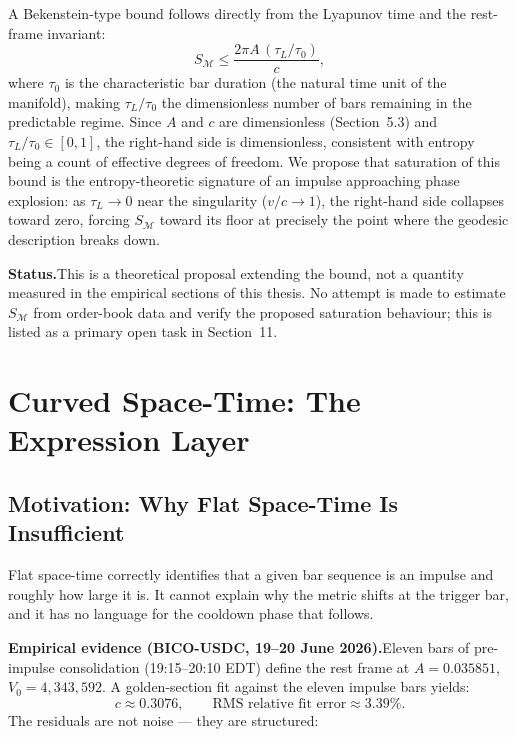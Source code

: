 \documentclass[12pt,a4paper]{article}
\begin{document}
A Bekenstein-type bound follows directly from the Lyapunov time and the
rest-frame invariant:
\begin{equation}
    \boxed{S_{\mathcal{M}} \leq \frac{2\pi A\,(\tau_L/\tau_0)}{c},}
    \label{eq:entropy_bound}
\end{equation}
where $\tau_0$ is the characteristic bar duration (the natural time
unit of the manifold), making $\tau_L/\tau_0$ the dimensionless number
of bars remaining in the predictable regime. Since $A$ and $c$ are
dimensionless (Section~5.3) and $\tau_L/\tau_0\in[0,1]$, the right-hand
side is dimensionless, consistent with entropy being a count of
effective degrees of freedom.
We propose that saturation of this bound is the entropy-theoretic
signature of an impulse approaching phase explosion: as $\tau_L\to0$
near the singularity ($v/c\to1$), the right-hand side collapses toward
zero, forcing $S_{\mathcal{M}}$ toward its floor at precisely the point
where the geodesic description breaks down.

\textbf{Status.}\quad This is a theoretical proposal extending the bound,
not a quantity measured in the empirical sections of this thesis.
No attempt is made to estimate $S_{\mathcal{M}}$ from order-book data
and verify the proposed saturation behaviour; this is listed as a
primary open task in Section~11.


\section{Curved Space-Time: The Expression Layer}
\label{sec:curved}

\subsection{Motivation: Why Flat Space-Time Is Insufficient}

Flat space-time correctly identifies that a given bar sequence is an
impulse and roughly how large it is. It cannot explain why the metric
shifts at the trigger bar, and it has no language for the cooldown phase
that follows.

\textbf{Empirical evidence (BICO-USDC, 19--20 June 2026).}\quad Eleven
bars of pre-impulse consolidation (19:15--20:10 EDT) define the rest
frame at $A=0.035851$, $V_0=4{,}343{,}592$. A golden-section fit against
the eleven impulse bars yields:
\begin{equation}
    c \approx 0.3076, \qquad \text{RMS relative fit error} \approx 3.39\%.
\end{equation}
The residuals are not noise --- they are structured:
\end{document}

